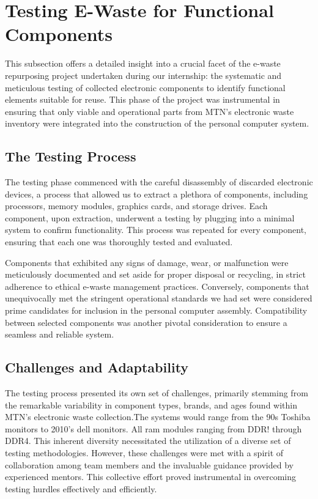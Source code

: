 \section{Testing E-Waste for Functional Components}

This subsection offers a detailed insight into a crucial facet of the e-waste repurposing project undertaken during our internship: the systematic and meticulous testing of collected electronic components to identify functional elements suitable for reuse. This phase of the project was instrumental in ensuring that only viable and operational parts from MTN's electronic waste inventory were integrated into the construction of the personal computer system.

\subsection{The Testing Process}

The testing phase commenced with the careful disassembly of discarded electronic devices, a process that allowed us to extract a plethora of components, including processors, memory modules, graphics cards, and storage drives. Each component, upon extraction, underwent a testing by plugging into a minimal system to confirm functionality. This process was repeated for every component, ensuring that each one was thoroughly tested and evaluated.

Components that exhibited any signs of damage, wear, or malfunction were meticulously documented and set aside for proper disposal or recycling, in strict adherence to ethical e-waste management practices. Conversely, components that unequivocally met the stringent operational standards we had set were considered prime candidates for inclusion in the personal computer assembly. Compatibility between selected components was another pivotal consideration to ensure a seamless and reliable system.

\subsection{Challenges and Adaptability}

The testing process presented its own set of challenges, primarily stemming from the remarkable variability in component types, brands, and ages found within MTN's electronic waste collection.The systems would range from the 90s Toshiba monitors to 2010's dell monitors. All ram modules ranging from DDR! through DDR4. This inherent diversity necessitated the utilization of a diverse set of testing methodologies. However, these challenges were met with a spirit of collaboration among team members and the invaluable guidance provided by experienced mentors. This collective effort proved instrumental in overcoming testing hurdles effectively and efficiently.

